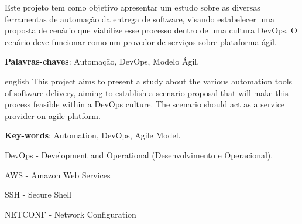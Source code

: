 
\setlength{\absparsep}{18pt} %
\begin{resumo}
Este projeto tem como objetivo apresentar um estudo sobre as diversas ferramentas de automação da entrega de software, visando estabelecer uma proposta de cenário que viabilize esse processo dentro de uma cultura DevOps. O cenário deve funcionar como um provedor de serviços sobre plataforma ágil.
 

 \textbf{Palavras-chaves}: Automação, DevOps, Modelo Ágil.
 
\end{resumo}

\begin{resumo}[Abstract]
 \begin{otherlanguage*}{english}
This project aims to present a study about the various automation tools of software delivery, aiming to establish a scenario proposal that will make this process feasible within a DevOps culture. The scenario should act as a service provider on agile platform.


   \vspace{\onelineskip}
 
   \noindent 
   \textbf{Key-words}: Automation, DevOps, Agile Model.
 \end{otherlanguage*}
\end{resumo}


\listoffigures*


\begin{siglas}
  \item DevOps - Development and Operational (Desenvolvimento e Operacional).
  \item AWS - Amazon Web Services
  \item SSH - Secure Shell
  \item NETCONF - Network Configuration
\end{siglas}


\tableofcontents*
\cleardoublepage

